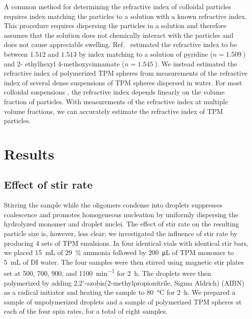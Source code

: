 A common method for determining the refractive index of colloidal particles
requires index matching the particles to a solution with a known refractive index.
This procedure requires dispersing the particles in a solution and therefore
assumes that the solution does not chemically interact with the particles
and does not cause appreciable swelling.  Ref.~\cite{vanderwel17} estimated the
refractive index to be between $\num{1.512}$ and $\num{1.513}$ by index matching
to a solution of pyridine ($n = \SI{1.509}{}$) and \num{2}- ethylhexyl \num{4}-methoxycinnamate
($n = \SI{1.545}{}$). We instead estimated the refractive index of polymerized TPM spheres
from measurements of the refractive index of several dense suspensions of TPM spheres
dispersed in water. For most colloidal suspensions \cite{alexander81}, the refractive index
depends linearly on the volume fraction of particles. With measurements of the refractive
index at multiple volume fractions, we can accurately estimate the refractive index of
TPM particles. 

\section{Results}
\subsection{Effect of stir rate}

Stirring the sample while the oligomers condense into droplets suppresses coalescence and
promotes homogeneous nucleation by uniformly dispersing the hydrolyzed monomer and droplet
nuclei. %
The effect of stir rate on the resulting particle size is, however, less clear;
we investigated the influence of stir rate by producing \num{4} sets of TPM emulsions.
In four identical vials with identical stir bars, we placed \SI{15}{\milli\liter} of 
\SI{29}{\percent} ammonia followed by \SI{200}{\micro\liter} of TPM 
monomer to \SI{5}{\milli\liter} of DI water. The four samples were then stirred 
using magnetic stir plates set at \num{500}, \num{700}, \num{900}, and
\SI{1100}{\minute^{-1}} for \SI{2}{\hour}. 
The droplets were then polymerized by adding
\num{2},\num{2}'-azobis(\num{2}-methylpropionitrile, Sigma Aldrich) (AIBN) as a radical initiator and %
heating the sample to \SI{80}{\celsius} for \SI{2}{\hour}.
We prepared a sample of unpolymerized droplets and a sample of polymerized TPM spheres
at each of the four spin rates, for a total of eight samples.

